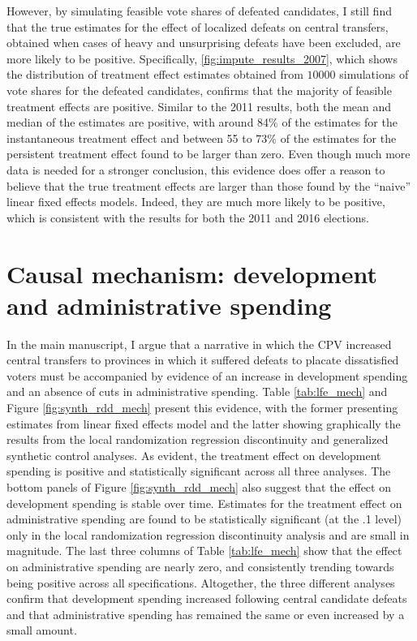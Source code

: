 \documentclass[12pt]{article}
\newcommand{\1}{\mathbbm{1}}
\begin{document}
However, by simulating feasible vote shares of defeated candidates, I still find that the true estimates for the effect of localized defeats on central transfers, obtained when cases of heavy and unsurprising defeats have been excluded, are more likely to be positive. Specifically, \autoref{fig:impute_results_2007}, which shows the distribution of treatment effect estimates obtained from $10000$ simulations of vote shares for the defeated candidates, confirms that the majority of feasible treatment effects are positive. Similar to the 2011 results, both the mean and median of the estimates are positive, with around 84\% of the estimates for the instantaneous treatment effect and between 55 to 73\% of the estimates for the persistent treatment effect found to be larger than zero. Even though much more data is needed for a stronger conclusion, this evidence does offer a reason to believe that the true treatment effects are larger than those found by the ``naive'' linear fixed effects models. Indeed, they are much more likely to be positive, which is consistent with the results for both the 2011 and 2016 elections.

\clearpage

\section{Causal mechanism: development and administrative spending}
\label{app:mechanisms}

In the main manuscript, I argue that a narrative in which the CPV increased central transfers to provinces in which it suffered defeats to placate dissatisfied voters must be accompanied by evidence of an increase in development spending and an absence of cuts in administrative spending. Table \ref{tab:lfe_mech} and Figure \ref{fig:synth_rdd_mech} present this evidence, with the former presenting estimates from linear fixed effects model and the latter showing graphically the results from the local randomization regression discontinuity and generalized synthetic control analyses. As evident, the treatment effect on development spending is positive and statistically significant across all three analyses. The bottom panels of Figure \ref{fig:synth_rdd_mech} also suggest that the effect on development spending is stable over time. Estimates for the treatment effect on administrative spending are found to be statistically significant (at the .1 level) only in the local randomization regression discontinuity analysis and are small in magnitude. The last three columns of Table \ref{tab:lfe_mech} show that the effect on administrative spending are nearly zero, and consistently trending towards being positive across all specifications. Altogether, the three different analyses confirm that development spending increased following central candidate defeats and that administrative spending has remained the same or even increased by a small amount.
\end{document}
